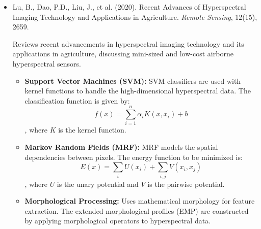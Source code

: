 \documentclass[10pt,svgnames,fragile]{beamer}
\begin{document}
\begin{frame}
\tiny
\begin{itemize}

    \item Lu, B., Dao, P.D., Liu, J., et al. (2020). Recent Advances of Hyperspectral Imaging Technology and Applications in Agriculture. \textit{Remote Sensing}, 12(15), 2659. \href{https://doi.org/10.3390/rs12162659}{\color{blue}{DOI: 10.3390/rs12152659}} \cite{luRecentAdvancesHyperspectral2020}
    
    {\color{gray}Reviews recent advancements in hyperspectral imaging technology and its applications in agriculture, discussing mini-sized and low-cost airborne hyperspectral sensors.}
    \begin{itemize} \tiny
    \item \textbf{Support Vector Machines (SVM):} SVM classifiers are used with kernel functions to handle the high-dimensional hyperspectral data. The classification function is given by: \[ f(x) = \sum_{i=1}^{n} \alpha_i K(x, x_i) + b \], where \( K \) is the kernel function.
    \item \textbf{Markov Random Fields (MRF):} MRF models the spatial dependencies between pixels. The energy function to be minimized is: \[ E(x) = \sum_{i} U(x_i) + \sum_{i,j} V(x_i, x_j) \], where \( U \) is the unary potential and \( V \) is the pairwise potential.
    \item \textbf{Morphological Processing:} Uses mathematical morphology for feature extraction. The extended morphological profiles (EMP) are constructed by applying morphological operators to hyperspectral data.
    \end{itemize}













\end{itemize}
\end{frame}
\end{document}
